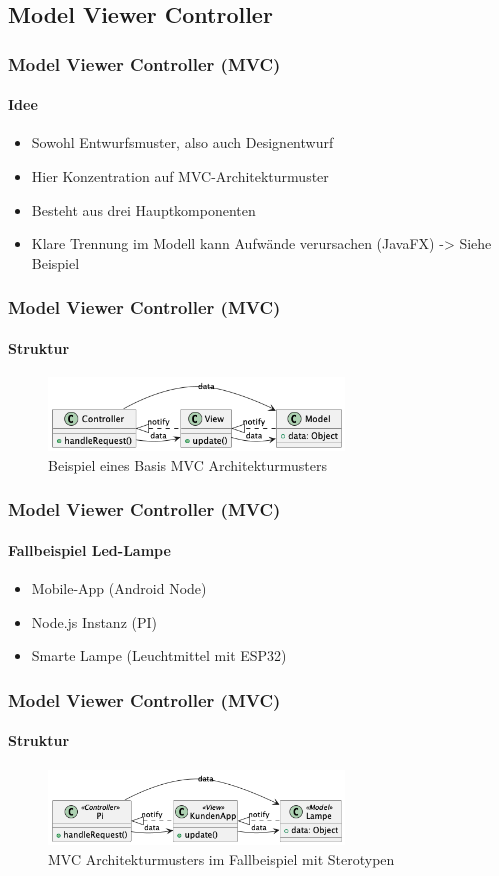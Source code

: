 
\subsection{Model Viewer Controller}
\begin{frame}
  \frametitle{Model Viewer Controller (MVC)}
  \framesubtitle{Idee}
  \begin{itemize}
    \item Sowohl Entwurfsmuster, also auch Designentwurf
    \item Hier Konzentration auf MVC-Architekturmuster
    \item Besteht aus drei Hauptkomponenten 
    \item Klare Trennung im Modell kann Aufwände verursachen (JavaFX) -> Siehe Beispiel
  \end{itemize}
\end{frame}

\begin{frame}
  \frametitle{Model Viewer Controller (MVC)}
  \framesubtitle{Struktur}
  \begin{figure}[ht]
    \centering
    \includegraphics[width=0.7\textwidth]{fig/uml/default-mvc.png}
    \caption{Beispiel eines Basis MVC Architekturmusters}
    \label{fig:default-mvc}
  \end{figure}
\end{frame}

\begin{frame}
  \frametitle{Model Viewer Controller (MVC)}
  \framesubtitle{Fallbeispiel Led-Lampe}
  \begin{itemize}
    \item Mobile-App (Android Node) 
    \item Node.js Instanz (PI)
    \item Smarte Lampe  (Leuchtmittel mit ESP32) 
  \end{itemize}
\end{frame}

\begin{frame}
  \frametitle{Model Viewer Controller (MVC)}
  \framesubtitle{Struktur}
  \begin{figure}[ht]
    \centering
    \includegraphics[width=0.7\textwidth]{fig/uml/sterotypen-mvc.png}
    \caption{MVC Architekturmusters im Fallbeispiel mit Sterotypen}
    \label{fig:stereo-mvc}
  \end{figure}
\end{frame}

